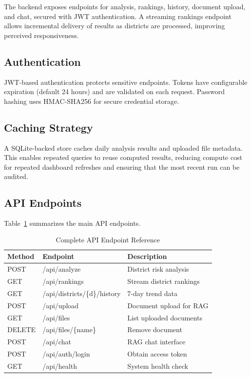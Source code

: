 \documentclass[conference]{IEEEtran}
\begin{document}
The backend exposes endpoints for analysis, rankings, history, document upload, and chat, secured with JWT authentication. A streaming rankings endpoint allows incremental delivery of results as districts are processed, improving perceived responsiveness.

\subsection{Authentication}
JWT-based authentication protects sensitive endpoints. Tokens have configurable expiration (default 24 hours) and are validated on each request. Password hashing uses HMAC-SHA256 for secure credential storage.

\subsection{Caching Strategy}
A SQLite-backed store caches daily analysis results and uploaded file metadata. This enables repeated queries to reuse computed results, reducing compute cost for repeated dashboard refreshes and ensuring that the most recent run can be audited.

\subsection{API Endpoints}
Table~\ref{tab:endpoints} summarizes the main API endpoints.

\begin{table}[htbp]
\centering
\caption{Complete API Endpoint Reference}
\begin{tabular}{@{}llp{4cm}@{}}
\toprule
\textbf{Method} & \textbf{Endpoint} & \textbf{Description} \\
\midrule
POST & /api/analyze & District risk analysis \\
GET & /api/rankings & Stream district rankings \\
GET & /api/districts/\{d\}/history & 7-day trend data \\
POST & /api/upload & Document upload for RAG \\
GET & /api/files & List uploaded documents \\
DELETE & /api/files/\{name\} & Remove document \\
POST & /api/chat & RAG chat interface \\
POST & /api/auth/login & Obtain access token \\
GET & /api/health & System health check \\
\bottomrule
\end{tabular}
\label{tab:endpoints}
\end{table}
\end{document}
